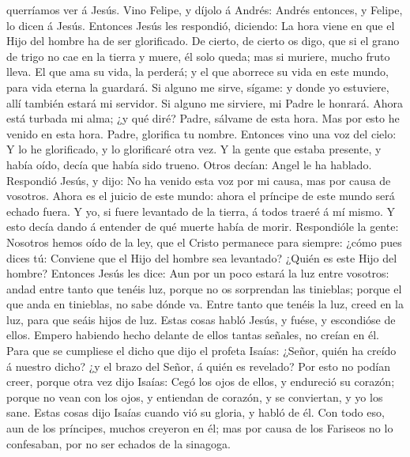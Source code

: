 querríamos ver á Jesús.  Vino Felipe, y díjolo á Andrés:
Andrés entonces, y Felipe, lo dicen á Jesús.  Entonces
Jesús les respondió, diciendo: La hora viene en que el Hijo del hombre
ha de ser glorificado.  De cierto, de cierto os digo, que
si el grano de trigo no cae en la tierra y muere, él solo queda; mas si
muriere, mucho fruto lleva.  El que ama su vida, la
perderá; y el que aborrece su vida en este mundo, para vida eterna la
guardará.  Si alguno me sirve, sígame: y donde yo
estuviere, allí también estará mi servidor. Si alguno me sirviere, mi
Padre le honrará.  Ahora está turbada mi alma; ¿y qué
diré? Padre, sálvame de esta hora. Mas por esto he venido en esta hora.
 Padre, glorifica tu nombre. Entonces vino una voz del
cielo: Y lo he glorificado, y lo glorificaré otra vez.  Y
la gente que estaba presente, y había oído, decía que había sido trueno.
Otros decían: Angel le ha hablado.  Respondió Jesús, y
dijo: No ha venido esta voz por mi causa, mas por causa de vosotros.
 Ahora es el juicio de este mundo: ahora el príncipe de
este mundo será echado fuera.  Y yo, si fuere levantado
de la tierra, á todos traeré á mí mismo.  Y esto decía
dando á entender de qué muerte había de morir. 
Respondióle la gente: Nosotros hemos oído de la ley, que el Cristo
permanece para siempre: ¿cómo pues dices tú: Conviene que el Hijo del
hombre sea levantado? ¿Quién es este Hijo del hombre? 
Entonces Jesús les dice: Aun por un poco estará la luz entre vosotros:
andad entre tanto que tenéis luz, porque no os sorprendan las tinieblas;
porque el que anda en tinieblas, no sabe dónde va.  Entre
tanto que tenéis la luz, creed en la luz, para que seáis hijos de luz.
Estas cosas habló Jesús, y fuése, y escondióse de ellos. 
Empero habiendo hecho delante de ellos tantas señales, no creían en él.
 Para que se cumpliese el dicho que dijo el profeta
Isaías: ¿Señor, quién ha creído á nuestro dicho? ¿y el brazo del Señor,
á quién es revelado?  Por esto no podían creer, porque
otra vez dijo Isaías:  Cegó los ojos de ellos, y
endureció su corazón; porque no vean con los ojos, y entiendan de
corazón, y se conviertan, y yo los sane.  Estas cosas
dijo Isaías cuando vió su gloria, y habló de él.  Con
todo eso, aun de los príncipes, muchos creyeron en él; mas por causa de
los Fariseos no lo confesaban, por no ser echados de la sinagoga.
